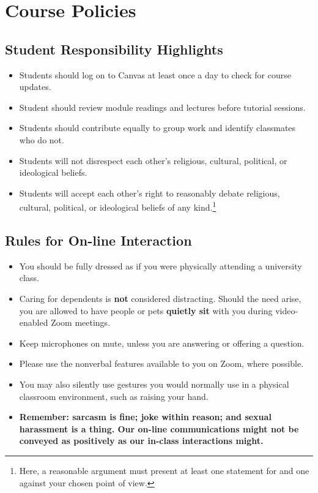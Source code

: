 \documentclass[10pt,]{article}
\providecommand{\tightlist}{%
  \setlength{\itemsep}{0pt}\setlength{\parskip}{0pt}}
\begin{document}
\newpage

\hypertarget{course-policies}{%
\section{Course Policies}\label{course-policies}}

\hypertarget{student-responsibility-highlights}{%
\subsection{Student Responsibility
Highlights}\label{student-responsibility-highlights}}

\begin{itemize}
\tightlist
\item
  Students should log on to Canvas at least once a day to check for
  course updates.
\item
  Student should review module readings and lectures before tutorial
  sessions.
\item
  Students should contribute equally to group work and identify
  classmates who do not.
\item
  Students will not disrespect each other's religious, cultural,
  political, or ideological beliefs.
\item
  Students will accept each other's right to reasonably debate
  religious, cultural, political, or ideological beliefs of any
  kind.\footnote{Here, a reasonable argument must present at least one
    statement for and one against your chosen point of view.}
\end{itemize}

\hypertarget{rules-for-on-line-interaction}{%
\subsection{Rules for On-line
Interaction}\label{rules-for-on-line-interaction}}

\begin{itemize}
\tightlist
\item
  You should be fully dressed as if you were physically attending a
  university class.
\item
  Caring for dependents is \textbf{not} considered distracting. Should
  the need arise, you are allowed to have people or pets \textbf{quietly
  sit} with you during video-enabled Zoom meetings.
\item
  Keep microphones on mute, unless you are answering or offering a
  question.
\item
  Please use the nonverbal features available to you on Zoom, where
  possible.
\item
  You may also silently use gestures you would normally use in a
  physical classroom environment, such as raising your hand.
\item
  \textbf{Remember: sarcasm is fine; joke within reason; and sexual
  harassment is a thing. Our on-line communications might not be
  conveyed as positively as our in-class interactions might.}
\end{itemize}
\end{document}
